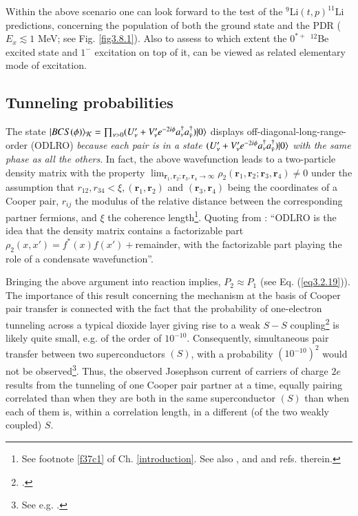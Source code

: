 Within the above scenario one can look forward to the test of the $^9$Li$(t,p)^{11}$Li predictions, concerning the population of both the ground state and the PDR ($E_x\lesssim1$ MeV; see Fig. \ref{fig3.8.1}). Also to assess to which extent the $0^{*+}$ $^{12}$Be excited state and $1^-$ excitation on top of it, can be viewed as related elementary mode of excitation.
 \subsection{Tunneling probabilities}\label{App4.B.3}
 The state $ |{BCS(\phi)} \rangle_{\mathcal K}=\prod_{\nu>0}(U'_\nu+V'_\nu e^{-2i\phi} a_\nu^\dagger a_{\bar{\nu}}^\dagger)|{0} \rangle$  displays off-diagonal-long-range-order (ODLRO) \textit{because each pair is in a state $(U'_\nu+V'_\nu e^{-2i\phi} a_\nu^\dagger a_{\bar{\nu}}^\dagger)|{0} \rangle$ with the same phase as all the others}. In fact, the above wavefunction  leads to a two-particle density matrix with the property $\lim_{\mathbf r_1, \mathbf r_2;\mathbf r_3, \mathbf r_4\rightarrow\infty}\rho_2(\mathbf r_1, \mathbf r_2;\mathbf r_3, \mathbf r_4)\neq 0$ under the assumption that $r_{12}, r_{34}<\xi, (\mathbf r_1, \mathbf r_2)$ and $(\mathbf r_3, \mathbf r_4)$ being the coordinates of a Cooper pair, $r_{ij}$ the  modulus of the  relative distance between the corresponding partner fermions, and $\xi$ the coherence length\footnote{See footnote \ref{f37c1} of Ch. \ref{introduction}. See also \cite{Ambegaokar:69}, and \cite{Potel:17} and refs. therein.}. Quoting from \cite{Anderson:96}: ``ODLRO 
  is the idea that the density matrix contains a factorizable part $\rho_2(x,x')=f^*(x)f(x')+$remainder, with the factorizable part playing the role of a condensate wavefunction''.
 
 
 
Bringing the above argument into reaction implies,  $P_2\approx P_1$  (see Eq. (\ref{eq3.2.19})).
 The importance of this result  concerning the mechanism at the basis of Cooper pair transfer is connected with the fact that the probability of one-electron tunneling across a typical dioxide layer giving rise to a weak $S-S$ coupling\footnote{\cite{Pippard:12}.} is likely quite small, e.g.  of the order of $10^{-10}$. Consequently, simultaneous pair transfer between two superconductors $(S)$, with a probability  $(10^{-10})^2$ would not be observed\footnote{See e.g. \cite{McDonald:01}.}. Thus, the observed Josephson current of carriers of charge $2e$ results from the tunneling of one Cooper pair partner at a time, equally pairing correlated than when they are both in the same superconductor $(S)$ than when each of them is, within a correlation length,  in a different (of the two weakly coupled) $S$. 

